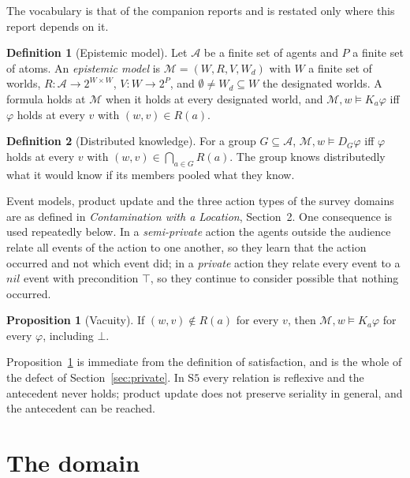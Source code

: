 \documentclass[11pt,a4paper]{article}
\theoremstyle{definition}
\newtheorem{definition}{Definition}
\newtheorem{proposition}{Proposition}
\newcommand{\Ag}{\mathcal{A}}
\newcommand{\Mod}{\mathcal{M}}
\newcommand{\Kop}[1]{K_{#1}}
\newcommand{\Dop}[1]{D_{#1}}
\begin{document}
The vocabulary is that of the companion reports and is restated only where this
report depends on it.

\begin{definition}[Epistemic model]
Let $\Ag$ be a finite set of agents and $P$ a finite set of atoms. An
\emph{epistemic model} is $\Mod = (W, R, V, W_d)$ with $W$ a finite set of
worlds, $R : \Ag \to 2^{W\times W}$, $V : W \to 2^P$, and
$\emptyset \neq W_d \subseteq W$ the designated worlds. A formula holds at
$\Mod$ when it holds at every designated world, and
$\Mod, w \models \Kop{a}\varphi$ iff $\varphi$ holds at every $v$ with
$(w,v) \in R(a)$.
\end{definition}

\begin{definition}[Distributed knowledge]
For a group $G \subseteq \Ag$,
$\Mod, w \models \Dop{G}\varphi$ iff $\varphi$ holds at every $v$ with
$(w,v) \in \bigcap_{a \in G} R(a)$. The group knows distributedly what it would
know if its members pooled what they know.
\end{definition}

Event models, product update and the three action types of the survey domains
are as defined in \emph{Contamination with a Location}, Section~2. One
consequence is used repeatedly below. In a \emph{semi-private} action the agents
outside the audience relate all events of the action to one another, so they
learn that the action occurred and not which event did; in a \emph{private}
action they relate every event to a $\mathit{nil}$ event with precondition
$\top$, so they continue to consider possible that nothing occurred.

\begin{proposition}[Vacuity]
\label{prop:vacuity}
If $(w,v) \notin R(a)$ for every $v$, then
$\Mod, w \models \Kop{a}\varphi$ for every $\varphi$, including $\bot$.
\end{proposition}

\noindent
Proposition~\ref{prop:vacuity} is immediate from the definition of
satisfaction, and is the whole of the defect of Section~\ref{sec:private}. In
$\mathrm{S5}$ every relation is reflexive and the antecedent never holds;
product update does not preserve seriality in general, and the antecedent can
be reached.

\section{The domain}
\label{sec:domain}
\end{document}
